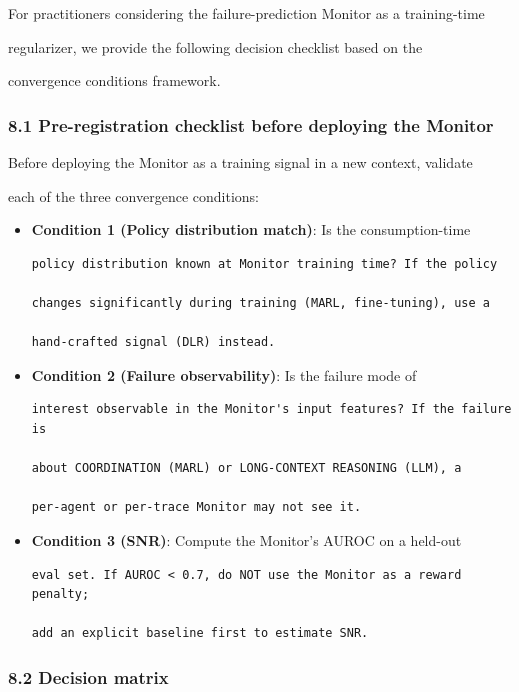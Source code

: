 \documentclass[11pt]{article}
\begin{document}
For practitioners considering the failure-prediction Monitor as a
training-time

regularizer, we provide the following decision checklist based on the

convergence conditions framework.

\subsubsection{8.1 Pre-registration checklist before deploying the
Monitor}\label{pre-registration-checklist-before-deploying-the-monitor}

Before deploying the Monitor as a training signal in a new context,
validate

each of the three convergence conditions:

\begin{itemize}
\item[$\square$]
  \textbf{Condition 1 (Policy distribution match)}: Is the
  consumption-time

\begin{verbatim}
policy distribution known at Monitor training time? If the policy

changes significantly during training (MARL, fine-tuning), use a

hand-crafted signal (DLR) instead.
\end{verbatim}
\item[$\square$]
  \textbf{Condition 2 (Failure observability)}: Is the failure mode of

\begin{verbatim}
interest observable in the Monitor's input features? If the failure is

about COORDINATION (MARL) or LONG-CONTEXT REASONING (LLM), a

per-agent or per-trace Monitor may not see it.
\end{verbatim}
\item[$\square$]
  \textbf{Condition 3 (SNR)}: Compute the Monitor's AUROC on a held-out

\begin{verbatim}
eval set. If AUROC < 0.7, do NOT use the Monitor as a reward penalty;

add an explicit baseline first to estimate SNR.
\end{verbatim}
\end{itemize}

\subsubsection{8.2 Decision matrix}\label{decision-matrix}
\end{document}
